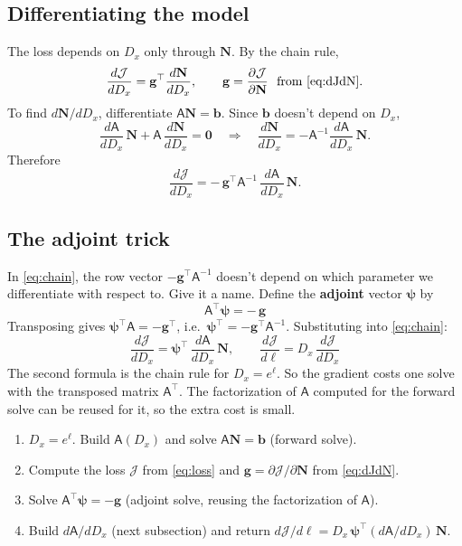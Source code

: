 \documentclass[11pt]{article}
\newcommand{\J}{\mathcal{J}}
\newcommand{\A}{\mathsf{A}}
\newcommand{\N}{\mathbf{N}}
\newcommand{\bpsi}{\bm{\psi}}
\begin{document}
\subsection{Differentiating the model}
The loss depends on $D_x$ only through $\N$. By the chain rule,
\[
\frac{d\J}{dD_x} = \mathbf{g}^{\top}\frac{d\N}{dD_x},\qquad \mathbf{g} = \frac{\partial\J}{\partial\N}\ \ \text{from \eqref{eq:dJdN}}.
\]
To find $d\N/dD_x$, differentiate $\A\N = \mathbf{b}$. Since $\mathbf{b}$ doesn't depend on $D_x$,
\[
\frac{d\A}{dD_x}\,\N + \A\,\frac{d\N}{dD_x} = \mathbf{0}
\quad\Longrightarrow\quad
\frac{d\N}{dD_x} = -\A^{-1}\frac{d\A}{dD_x}\,\N .
\]
Therefore
\begin{equation}\label{eq:chain}
\frac{d\J}{dD_x} = -\,\mathbf{g}^{\top}\A^{-1}\,\frac{d\A}{dD_x}\,\N .
\end{equation}

\subsection{The adjoint trick}
In \eqref{eq:chain}, the row vector $-\mathbf{g}^{\top}\A^{-1}$ doesn't depend on which parameter we differentiate with respect to. Give it a name. Define the \textbf{adjoint} vector $\bpsi$ by
\begin{equation}\label{eq:adjoint}
\boxed{\;\A^{\top}\bpsi = -\,\mathbf{g}\;}
\end{equation}
Transposing gives $\bpsi^{\top}\A = -\mathbf{g}^{\top}$, i.e.\ $\bpsi^{\top} = -\mathbf{g}^{\top}\A^{-1}$. Substituting into \eqref{eq:chain}:
\begin{equation}\label{eq:gradient}
\boxed{\;\frac{d\J}{dD_x} = \bpsi^{\top}\,\frac{d\A}{dD_x}\,\N,\qquad \frac{d\J}{d\ell} = D_x\,\frac{d\J}{dD_x}\;}
\end{equation}
The second formula is the chain rule for $D_x = e^{\ell}$. So the gradient costs one solve with the transposed matrix $\A^\top$. The factorization of $\A$ computed for the forward solve can be reused for it, so the extra cost is small.

\begin{tcolorbox}[mybox,title={\textbf{Loss and gradient at a guess $\ell$}}]
\begin{enumerate}[leftmargin=*,label=\arabic*.]
\item $D_x = e^{\ell}$. Build $\A(D_x)$ and solve $\A\N = \mathbf{b}$ (forward solve).
\item Compute the loss $\J$ from \eqref{eq:loss} and $\mathbf{g} = \partial\J/\partial\N$ from \eqref{eq:dJdN}.
\item Solve $\A^\top\bpsi = -\mathbf{g}$ (adjoint solve, reusing the factorization of $\A$).
\item Build $d\A/dD_x$ (next subsection) and return $d\J/d\ell = D_x\,\bpsi^\top (d\A/dD_x)\,\N$.
\end{enumerate}
\end{tcolorbox}
\end{document}
